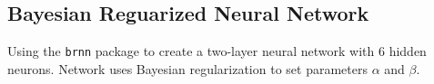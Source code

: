 \begin{Shaded}
\begin{Highlighting}[]
\OtherTok{\textless{}{-}} \SpecialCharTok{\textasciitilde{}}
                  \NormalTok{,}
                  \NormalTok{(}\NormalTok{),}
                  \NormalTok{,}
                  \SpecialCharTok{{-}}\NormalTok{(}\SpecialCharTok{{-}}\SpecialCharTok{+}\SpecialCharTok{*}

\OtherTok{\textless{}{-}}  \NormalTok{(}\SpecialCharTok{$}\SpecialCharTok{\%\textgreater{}\%} \NormalTok{()}
\end{Highlighting}
\end{Shaded}

\hypertarget{bayesian-reguarized-neural-network}{%
\subsection{Bayesian Reguarized Neural
Network}\label{bayesian-reguarized-neural-network}}

Using the \texttt{brnn} package \cite{brnn} to create a two-layer neural
network with 6 hidden neurons. Network uses Bayesian regularization to
set parameters \(\alpha\) and \(\beta\).

